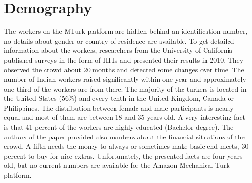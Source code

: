 \section{Demography}
The workers on the MTurk platform are hidden behind an identification number, no details about gender or country of residence are available. To get detailed information about the workers, researchers from the University of California published surveys in the form of HITs\cite{ross} and presented their results in 2010. They observed the crowd about 20 months and detected some changes over time. The number of Indian workers raised significantly within one year and approximately one third of the workers are from there. The majority of the turkers is located in the United States (56\%) and every tenth in the United Kingdom, Canada or Philippines. The distribution between female and male participants is nearly equal and most of them are between 18 and 35 years old. A very interesting fact is that 41 percent of the workers are highly educated (Bachelor degree). The authors of the paper provided also numbers about the financial situations of the crowd.  A fifth needs the money to always or sometimes make basic end meets, 30 percent to buy for nice extras. 
Unfortunately, the presented facts are four years old, but no current numbers are available for the Amazon Mechanical Turk platform.


